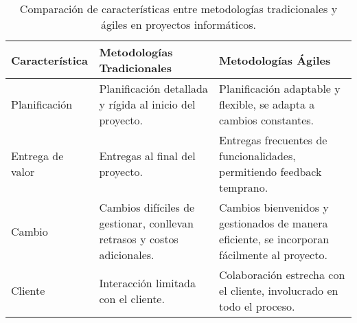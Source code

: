 \begin{table}[H]
\centering
\small %
\begin{tabular}{|l|p{5cm}|p{5cm}|} %
\hline
\textbf{Característica} & \textbf{Metodologías Tradicionales} & \textbf{Metodologías Ágiles} \\
\hline
Planificación & Planificación detallada y rígida al inicio del proyecto. & Planificación adaptable y flexible, se adapta a cambios constantes. \\
\hline
Entrega de valor & Entregas al final del proyecto. & Entregas frecuentes de funcionalidades, permitiendo feedback temprano. \\
\hline
Cambio & Cambios difíciles de gestionar, conllevan retrasos y costos adicionales. & Cambios bienvenidos y gestionados de manera eficiente, se incorporan fácilmente al proyecto. \\
\hline
Cliente & Interacción limitada con el cliente. & Colaboración estrecha con el cliente, involucrado en todo el proceso. \\
\hline
\end{tabular}
\caption{Comparación de características entre metodologías tradicionales y ágiles en proyectos informáticos.}
\label{tab:metodologias}
\end{table}
